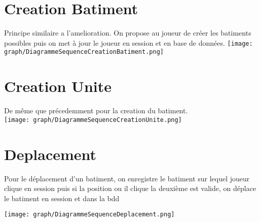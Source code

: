     \section{Creation Batiment}
    Principe similaire a l'amelioration. On propose au joueur de créer les batiments possibles puis on met à jour le joueur en session et en base de données. 
        \texttt{[image: graph/DiagrammeSequenceCreationBatiment.png]}  
        
   \section{Creation Unite}
   De même que précedemment pour la creation du batiment. \\

        \texttt{[image: graph/DiagrammeSequenceCreationUnite.png]}    
        
   \section{Deplacement}

    Pour le déplacement d'un batiment, on enregistre le batiment sur lequel joueur clique en session puis si la position ou il clique la deuxième est valide, on déplace le batiment en session et dans la bdd 
    
        \texttt{[image: graph/DiagrammeSequenceDeplacement.png]}    
        
 
